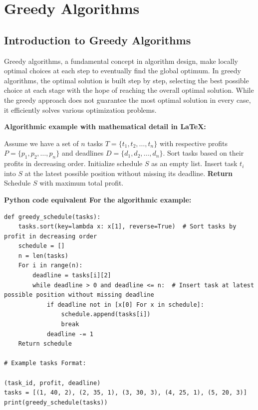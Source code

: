 \documentclass[12pt]{book} %
\begin{document}
\chapter{Greedy Algorithms}

\section{Introduction to Greedy Algorithms}
Greedy algorithms, a fundamental concept in algorithm design, make locally optimal choices at each step to eventually find the global optimum. In greedy algorithms, the optimal solution is built step by step, selecting the best possible choice at each stage with the hope of reaching the overall optimal solution. While the greedy approach does not guarantee the most optimal solution in every case, it efficiently solves various optimization problems.

\textbf{Algorithmic example with mathematical detail in LaTeX:}
\FloatBarrier

\begin{algorithm}
\caption{Greedy Algorithm Example}
\begin{algorithmic}[1]
\State Assume we have a set of $n$ tasks $T = \{t_1, t_2, \ldots, t_n\}$ with respective profits $P = \{p_1, p_2, \ldots, p_n\}$ and deadlines $D = \{d_1, d_2, \ldots, d_n\}$.
\State Sort tasks based on their profits in decreasing order.
\State Initialize schedule $S$ as an empty list.
    \State Insert task $t_i$ into $S$ at the latest possible position without missing its deadline.
\EndFor
\State \textbf{Return} Schedule $S$ with maximum total profit.
\end{algorithmic}
\end{algorithm}
\FloatBarrier

\textbf{Python code equivalent For the algorithmic example:}
\FloatBarrier
\begin{lstlisting}
def greedy_schedule(tasks):
    tasks.sort(key=lambda x: x[1], reverse=True)  # Sort tasks by profit in decreasing order
    schedule = []
    n = len(tasks)
    For i in range(n):
        deadline = tasks[i][2]
        while deadline > 0 and deadline <= n:  # Insert task at latest possible position without missing deadline
            if deadline not in [x[0] For x in schedule]:
                schedule.append(tasks[i])
                break
            deadline -= 1
    Return schedule

# Example tasks Format: 

(task_id, profit, deadline)
tasks = [(1, 40, 2), (2, 35, 1), (3, 30, 3), (4, 25, 1), (5, 20, 3)]
print(greedy_schedule(tasks))
\end{lstlisting}
\FloatBarrier
\end{document}
